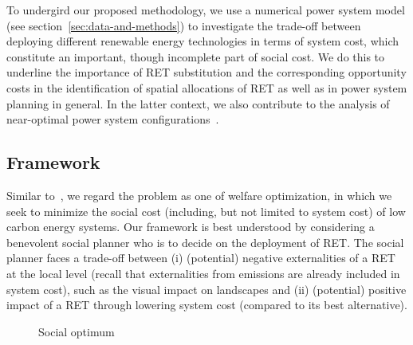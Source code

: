 \documentclass[review, 3p, times]{elsarticle} %
\begin{document}
    To undergird our proposed methodology, we use a numerical power system model (see
    section~\ref{sec:data-and-methods}) to investigate the trade-off between deploying different renewable energy
    technologies in terms of system cost, which constitute an important, though incomplete part of social cost.
    We do this to underline the importance of RET substitution and the corresponding opportunity costs in the
    identification of spatial allocations of RET as well as in power system planning in general.
    In the latter context, we also contribute to the analysis of near-optimal power system
    configurations~\citep[see e.g.][]{Neumann2019,Schlachtberger2017}.


    \subsection{Framework} \label{subsec:framework}
    Similar to~\cite{Drechsler2011}, we regard the problem as one of welfare optimization, in which we seek to minimize
    the social cost (including, but not limited to system cost) of low carbon energy systems.
    Our framework is best understood by considering a benevolent social planner who is to decide on the deployment of
    RET\@.
    The social planner faces a trade-off between
    (i) (potential) negative externalities of a RET at the local level (recall that externalities from emissions are
    already included in system cost), such as the visual impact on landscapes and
    (ii) (potential) positive impact of a RET through lowering system cost (compared to its best alternative).

    \begin{figure}[H]
        \centering
        \caption{Social optimum}
        \label{figure:social-optimum}
    \end{figure}
\end{document}

